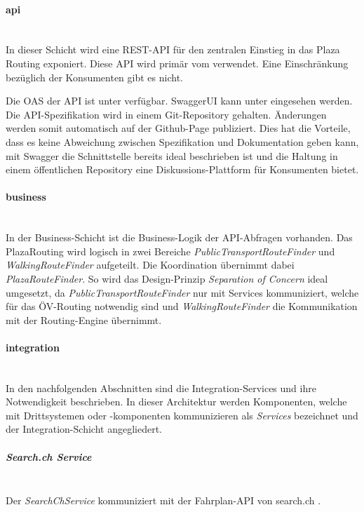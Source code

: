 \paragraph{api}\label{architektur:api-layer}~\\
In dieser Schicht wird eine \ac{REST}-\ac{API} für den zentralen Einstieg in das Plaza Routing exponiert. Diese \ac{API} wird primär vom  verwendet. Eine Einschränkung bezüglich der Konsumenten gibt es nicht.

Die \ac{OAS} \cite{open-api-specificaiton} der \ac{API} ist unter \cite{plaza-routing-api-spez} verfügbar. SwaggerUI kann unter \cite{plaza-routing-api-swaggerui} eingesehen werden. Die {API}-Spezifikation wird in einem Git-Repository gehalten. Änderungen werden somit automatisch auf der Github-Page \cite{plaza-routing-api-spez} publiziert. Dies hat die Vorteile, dass es keine Abweichung zwischen Spezifikation und Dokumentation geben kann, mit Swagger \cite{swagger} die Schnittstelle bereits ideal beschrieben ist und die Haltung in einem öffentlichen Repository eine Diskussions-Plattform für Konsumenten bietet.

\paragraph{business}\label{architektur:business-layer}~\\
In der Business-Schicht ist die Business-Logik der \ac{API}-Abfragen vorhanden. Das PlazaRouting wird logisch in zwei Bereiche \emph{PublicTransportRouteFinder} und \emph{WalkingRouteFinder} aufgeteilt. Die Koordination übernimmt dabei \emph{PlazaRouteFinder}. So wird das Design-Prinzip \emph{Separation of Concern} ideal umgesetzt, da \emph{PublicTransportRouteFinder} nur mit Services kommuniziert, welche für das ÖV-Routing notwendig sind und \emph{WalkingRouteFinder} die Kommunikation mit der Routing-Engine übernimmt.

\paragraph{integration}\label{architektur:integration-layer}~\\
In den nachfolgenden Abschnitten sind die Integration-Services und ihre Notwendigkeit beschrieben. In dieser Architektur werden Komponenten, welche mit Drittsystemen oder -komponenten kommunizieren als \emph{Services} bezeichnet und der Integration-Schicht angegliedert.

\subparagraph{Search.ch Service}\label{architektur:Search.ch Service}~\\
Der \emph{SearchChService} kommuniziert mit der Fahrplan-\ac{API} von search.ch \cite{search_ch_route_api}.

